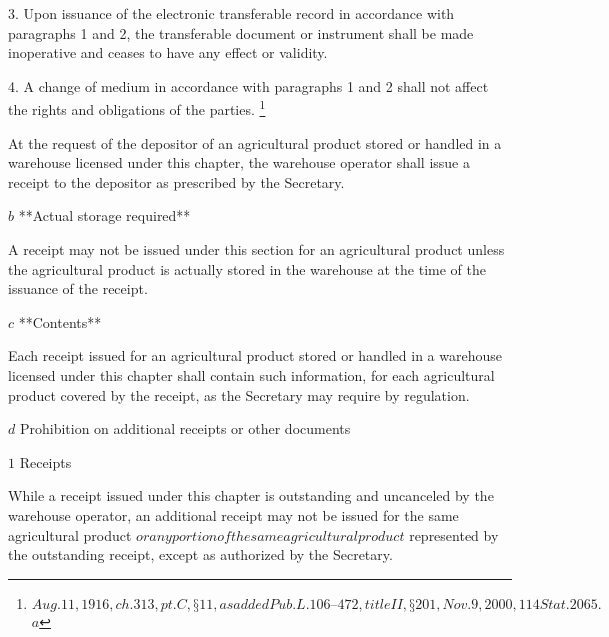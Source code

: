 3. Upon issuance of the electronic transferable record in accordance with paragraphs 1 and 2, the transferable document or instrument shall be made inoperative and ceases to have any effect or validity.

4. A change of medium in accordance with paragraphs 1 and 2 shall not affect the rights and obligations of the parties.
\footnote{\(Aug. 11, 1916, ch. 313, pt. C, § 11, as added Pub. L. 106–472, title II, § 201, Nov. 9, 2000, 114 Stat. 2065.\) \(a\) }


At the request of the depositor of an agricultural product stored or handled in a warehouse licensed under this chapter, the warehouse operator shall issue a receipt to the depositor as prescribed by the Secretary.

\(b\) **Actual storage required**

A receipt may not be issued under this section for an agricultural product unless the agricultural product is actually stored in the warehouse at the time of the issuance of the receipt.

\(c\) **Contents**

Each receipt issued for an agricultural product stored or handled in a warehouse licensed under this chapter shall contain such information, for each agricultural product covered by the receipt, as the Secretary may require by regulation.

\(d\) Prohibition on additional receipts or other documents

\(1\) Receipts

While a receipt issued under this chapter is outstanding and uncanceled by the warehouse operator, an additional receipt may not be issued for the same agricultural product \(or any portion of the same agricultural product\) represented by the outstanding receipt, except as authorized by the Secretary.

